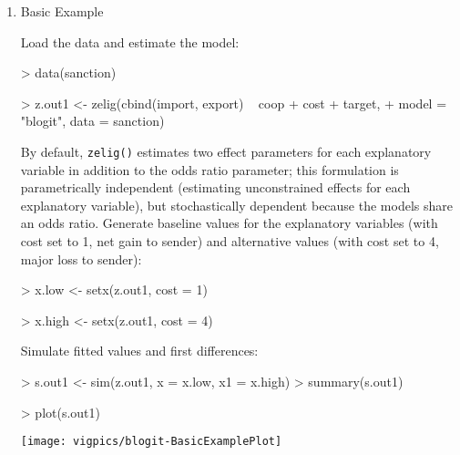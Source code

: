 \documentclass{article}
\begin{document}
\begin{enumerate}

\item {Basic Example} \label{basic.bl}

Load the data and estimate the model:  
\begin{Schunk}
\begin{Sinput}
> data(sanction)
\end{Sinput}
\end{Schunk}
\begin{Schunk}
\begin{Sinput}
> z.out1 <- zelig(cbind(import, export) ~ coop + cost + target, 
+     model = "blogit", data = sanction)
\end{Sinput}
\end{Schunk}
By default, {\tt zelig()} estimates two effect parameters
for each explanatory variable in addition to the odds ratio parameter;
this formulation is parametrically independent (estimating
unconstrained effects for each explanatory variable), but
stochastically dependent because the models share an odds ratio.
\newline \newline Generate baseline values for the explanatory
variables (with cost set to 1, net gain to sender) and alternative
values (with cost set to 4, major loss to sender):
\begin{Schunk}
\begin{Sinput}
> x.low <- setx(z.out1, cost = 1)
\end{Sinput}
\end{Schunk}
\begin{Schunk}
\begin{Sinput}
> x.high <- setx(z.out1, cost = 4)
\end{Sinput}
\end{Schunk}
Simulate fitted values and first differences:  
\begin{Schunk}
\begin{Sinput}
> s.out1 <- sim(z.out1, x = x.low, x1 = x.high)
> summary(s.out1)
\end{Sinput}
\end{Schunk}
\begin{center}
\begin{Schunk}
\begin{Sinput}
> plot(s.out1)
\end{Sinput}
\end{Schunk}
\texttt{[image: vigpics/blogit-BasicExamplePlot]}
\end{center}


\end{enumerate}
\end{document}
